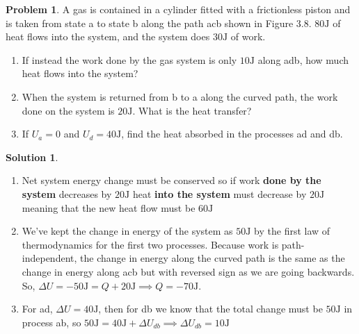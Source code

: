 \documentclass[10pt]{article}
\theoremstyle{definition}
\newtheorem{problem}{Problem}
\newtheorem{soln}{Solution}
\begin{document}
\begin{problem}
A gas is contained in a cylinder fitted with a frictionless piston and is taken from state a to state b along the path acb shown in Figure 3.8.
$80\unit{\joule}$ of heat flows into the system, and the system does $30\unit{\joule}$ of work.
\begin{enumerate}[label=(\alph*)]
  \item If instead the work done by the gas system is only $10\unit{\joule}$ along adb, how much heat flows into the system?
  \item When the system is returned from b to a along the curved path, the work done on the system is $20\unit{\joule}$. What is the heat transfer?
  \item If $U_a = 0$ and $U_d = 40\unit{\joule}$, find the heat absorbed in the processes ad and db.
\end{enumerate}
\end{problem}
\begin{soln}~
  \begin{enumerate}[label=(\alph*)]
    \item Net system energy change must be conserved so if work \textbf{done by the system} decreases by $20\unit{\joule}$ heat \textbf{into the system} must decrease by $20\unit{\joule}$ meaning that the new heat flow must be $60\unit{\joule}$
    \item We've kept the change in energy of the system as $50\unit{\joule}$ by the first law of thermodynamics for the first two processes. Because work is path-independent, the change in energy along
          the curved path is the same as the change in energy along acb but with reversed sign as we are going backwards. So, $\Delta U=-50\unit{\joule}=Q+20\unit{\joule}\implies Q=-70\unit{\joule}$.
    \item For ad, $\Delta U =40\unit{\joule}$, then for db we know that the total change must be $50\unit{\joule}$ in process ab, so $50\unit{\joule}=40\unit{\joule}+\Delta U_{db}\implies \Delta U_{db}=10\unit{\joule}$
  \end{enumerate}
\end{soln}
\end{document}
